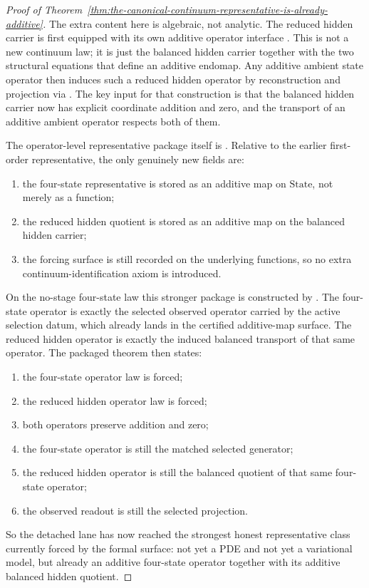 \begin{proof}[Proof of Theorem~\ref{thm:the-canonical-continuum-representative-is-already-additive}]
\label{proof:thm:the-canonical-continuum-representative-is-already-additive}
The extra content here is algebraic, not analytic. The reduced hidden carrier
is first equipped with its own additive operator interface
. This is not a new continuum law; it is
just the balanced hidden carrier together with the two structural equations
that define an additive endomap. Any additive ambient state operator then
induces such a reduced hidden operator by reconstruction and projection via
. The key input for that
construction is that the balanced hidden carrier now has explicit coordinate
addition and zero, and the transport of an additive ambient operator respects
both of them.

The operator-level representative package itself is
. Relative to the earlier
first-order representative, the only genuinely new fields are:
\begin{enumerate}
\item the four-state representative is stored as an additive map on
      \(\mathrm{State}\), not merely as a function;
\item the reduced hidden quotient is stored as an additive map on the balanced
      hidden carrier;
\item the forcing surface is still recorded on the underlying functions, so no
      extra continuum-identification axiom is introduced.
\end{enumerate}

On the no-stage four-state law this stronger package is constructed by
. The
four-state operator is exactly the selected observed operator carried by the
active selection datum, which already lands in the certified additive-map
surface. The reduced hidden
operator is exactly the induced balanced transport of that same operator. The
packaged theorem
then states:
\begin{enumerate}
\item the four-state operator law is forced;
\item the reduced hidden operator law is forced;
\item both operators preserve addition and zero;
\item the four-state operator is still the matched selected generator;
\item the reduced hidden operator is still the balanced quotient of that same
      four-state operator;
\item the observed readout is still the selected projection.
\end{enumerate}

So the detached lane has now reached the strongest honest representative class
currently forced by the formal surface: not yet a PDE and not yet a
variational model, but already an additive four-state operator together with
its additive balanced hidden quotient.
\end{proof}

